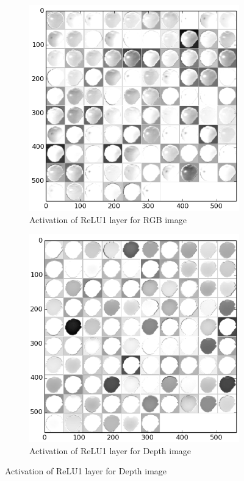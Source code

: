 \begin{figure}[htbp]
	\centering
	\begin{subfigure}[b]{0.45\linewidth}
		\includegraphics[width=\textwidth]{img/relu1_rgb.png}
		\caption{Activation of ReLU1 layer for RGB image}
	\end{subfigure}   	
	\begin{subfigure}[b]{0.45\linewidth}
		\includegraphics[width=\textwidth]{img/relu1_dep.png}
		\caption{Activation of ReLU1 layer for Depth image}
	\end{subfigure}
	

\end{figure}
